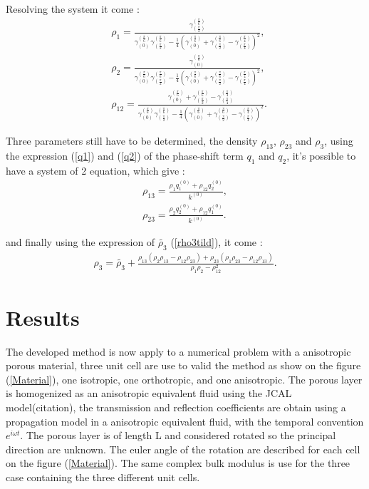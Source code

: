 \documentclass{article}
\begin{document}
    Resolving the system it come :
    \begin{align}
        &\rho_1=\frac{\gamma^{(\frac{\pi}{6})}_{(\frac{\pi}{2})}}{\gamma^{(\frac{\pi}{6})}_{(0)}\gamma^{(\frac{\pi}{6})}_{(\frac{\pi}{2})}-\frac{1}{4}(\gamma^{(\frac{\pi}{6})}_{(0)}+\gamma^{(\frac{\pi}{6})}_{(\frac{\pi}{2})}-\gamma^{(\frac{\pi}{4})}_{(\frac{\pi}{4})})^2},\label{rho1}\\
        &\rho_2=\frac{\gamma^{(\frac{\pi}{6})}_{(0)}}{\gamma^{(\frac{\pi}{6})}_{(0)}\gamma^{(\frac{\pi}{6})}_{(\frac{\pi}{2})}-\frac{1}{4}(\gamma^{(\frac{\pi}{6})}_{(0)}+\gamma^{(\frac{\pi}{6})}_{(\frac{\pi}{2})}-\gamma^{(\frac{\pi}{4})}_{(\frac{\pi}{4})})^2},\label{rho2}\\
        &\rho_{12}=\frac{\gamma^{(\frac{\pi}{6})}_{(0)}+\gamma^{(\frac{\pi}{6})}_{(\frac{\pi}{2})}-\gamma^{(\frac{\pi}{4})}_{(\frac{\pi}{4})}}{\gamma^{(\frac{\pi}{6})}_{(0)}\gamma^{(\frac{\pi}{6})}_{(\frac{\pi}{2})}-\frac{1}{4}(\gamma^{(\frac{\pi}{6})}_{(0)}+\gamma^{(\frac{\pi}{6})}_{(\frac{\pi}{2})}-\gamma^{(\frac{\pi}{4})}_{(\frac{\pi}{4})})^2}.\label{rho12}
    \end{align}
    
    Three parameters still have to be determined, the density $\rho_{13}$, $\rho_{23}$ and $\rho_3$, using the expression (\ref{q1}) and (\ref{q2}) of the phase-shift term $q_1$ and $q_2$, it's possible to have a system of 2 equation, which give :
    \begin{align}
    \rho_{13}=\frac{\rho_1q_1^{(0)}+\rho_{12}q_2^{(0)}}{k^{(0)}},\\
    \rho_{23}=\frac{\rho_2q_2^{(0)}+\rho_{12}q_1^{(0)}}{k^{(0)}}.
    \end{align}
    
    and finally using the expression of $\tilde{\rho_3}$ (\ref{rho3tild}), it come :
    \begin{align}
    \rho_3=\tilde{\rho_3}+\frac{\rho_{13}(\rho_2\rho_{13}-\rho_{12}\rho_{23})+\rho_{23}(\rho_1\rho_{23}-\rho_{12}\rho_{13})}{\rho_1\rho_2-\rho_{12}^2}.
    \end{align}

    
\section{Results}
    The developed method is now apply to a numerical problem with a anisotropic porous material, three unit cell are use to valid the method as show on the figure (\ref{Material}), one isotropic, one orthotropic, and one anisotropic. The porous layer is homogenized as an anisotropic equivalent fluid using the JCAL model(citation), the transmission and reflection coefficients are obtain using a propagation model in a anisotropic equivalent fluid, with the temporal convention $e^{i\omega t}$. The porous layer is of length L and considered rotated so the principal direction are unknown. The euler angle of the rotation are described for each cell on the figure (\ref{Material}). The same complex bulk modulus is use for the three case containing the three different unit cells. 
\end{document}
